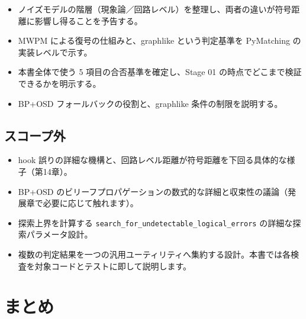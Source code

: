 \begin{itemize}
  \item ノイズモデルの階層（現象論／回路レベル）を整理し、両者の違いが符号距離に影響し得ることを予告する。
  \item MWPM による復号の仕組みと、graphlike という判定基準を PyMatching の実装レベルで示す。
  \item 本書全体で使う 5 項目の合否基準を確定し、Stage 01 の時点でどこまで検証できるかを明示する。
  \item BP+OSD フォールバックの役割と、graphlike 条件の制限を説明する。
\end{itemize}

\subsection{スコープ外}

\begin{itemize}
  \item hook 誤りの詳細な機構と、回路レベル距離が符号距離を下回る具体的な様子（第14章）。
  \item BP+OSD のビリーフプロパゲーションの数式的な詳細と収束性の議論（発展章で必要に応じて触れます）。
  \item 探索上界を計算する \texttt{search\_for\_undetectable\_logical\_errors} の詳細な探索パラメータ設計。
  \item 複数の判定結果を一つの汎用ユーティリティへ集約する設計。本書では各検査を対象コードとテストに即して説明します。
\end{itemize}

\section{まとめ}\label{ch8:summary}

